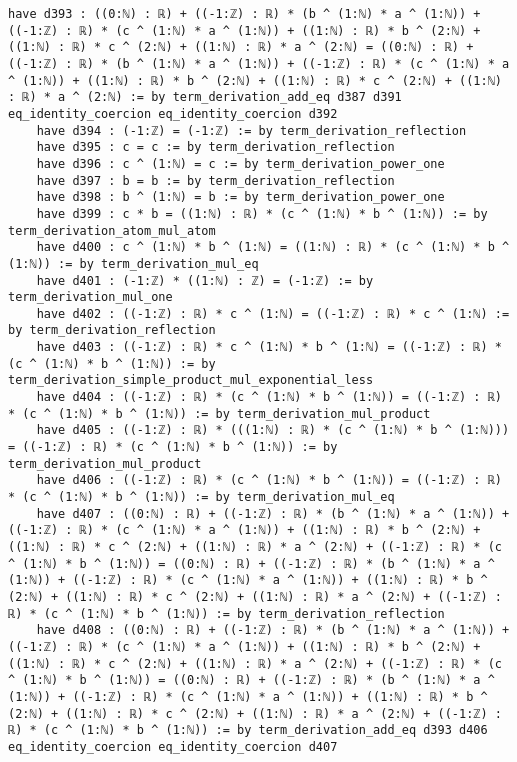 \documentclass{article}
\begin{document}
\begin{tcolorbox}[colback=white!10, width=\linewidth]
\begin{lstlisting}[language=Lean4]
    have d393 : ((0:ℕ) : ℝ) + ((-1:ℤ) : ℝ) * (b ^ (1:ℕ) * a ^ (1:ℕ)) + ((-1:ℤ) : ℝ) * (c ^ (1:ℕ) * a ^ (1:ℕ)) + ((1:ℕ) : ℝ) * b ^ (2:ℕ) + ((1:ℕ) : ℝ) * c ^ (2:ℕ) + ((1:ℕ) : ℝ) * a ^ (2:ℕ) = ((0:ℕ) : ℝ) + ((-1:ℤ) : ℝ) * (b ^ (1:ℕ) * a ^ (1:ℕ)) + ((-1:ℤ) : ℝ) * (c ^ (1:ℕ) * a ^ (1:ℕ)) + ((1:ℕ) : ℝ) * b ^ (2:ℕ) + ((1:ℕ) : ℝ) * c ^ (2:ℕ) + ((1:ℕ) : ℝ) * a ^ (2:ℕ) := by term_derivation_add_eq d387 d391 eq_identity_coercion eq_identity_coercion d392
    have d394 : (-1:ℤ) = (-1:ℤ) := by term_derivation_reflection
    have d395 : c = c := by term_derivation_reflection
    have d396 : c ^ (1:ℕ) = c := by term_derivation_power_one
    have d397 : b = b := by term_derivation_reflection
    have d398 : b ^ (1:ℕ) = b := by term_derivation_power_one
    have d399 : c * b = ((1:ℕ) : ℝ) * (c ^ (1:ℕ) * b ^ (1:ℕ)) := by term_derivation_atom_mul_atom
    have d400 : c ^ (1:ℕ) * b ^ (1:ℕ) = ((1:ℕ) : ℝ) * (c ^ (1:ℕ) * b ^ (1:ℕ)) := by term_derivation_mul_eq
    have d401 : (-1:ℤ) * ((1:ℕ) : ℤ) = (-1:ℤ) := by term_derivation_mul_one
    have d402 : ((-1:ℤ) : ℝ) * c ^ (1:ℕ) = ((-1:ℤ) : ℝ) * c ^ (1:ℕ) := by term_derivation_reflection
    have d403 : ((-1:ℤ) : ℝ) * c ^ (1:ℕ) * b ^ (1:ℕ) = ((-1:ℤ) : ℝ) * (c ^ (1:ℕ) * b ^ (1:ℕ)) := by term_derivation_simple_product_mul_exponential_less
    have d404 : ((-1:ℤ) : ℝ) * (c ^ (1:ℕ) * b ^ (1:ℕ)) = ((-1:ℤ) : ℝ) * (c ^ (1:ℕ) * b ^ (1:ℕ)) := by term_derivation_mul_product
    have d405 : ((-1:ℤ) : ℝ) * (((1:ℕ) : ℝ) * (c ^ (1:ℕ) * b ^ (1:ℕ))) = ((-1:ℤ) : ℝ) * (c ^ (1:ℕ) * b ^ (1:ℕ)) := by term_derivation_mul_product
    have d406 : ((-1:ℤ) : ℝ) * (c ^ (1:ℕ) * b ^ (1:ℕ)) = ((-1:ℤ) : ℝ) * (c ^ (1:ℕ) * b ^ (1:ℕ)) := by term_derivation_mul_eq
    have d407 : ((0:ℕ) : ℝ) + ((-1:ℤ) : ℝ) * (b ^ (1:ℕ) * a ^ (1:ℕ)) + ((-1:ℤ) : ℝ) * (c ^ (1:ℕ) * a ^ (1:ℕ)) + ((1:ℕ) : ℝ) * b ^ (2:ℕ) + ((1:ℕ) : ℝ) * c ^ (2:ℕ) + ((1:ℕ) : ℝ) * a ^ (2:ℕ) + ((-1:ℤ) : ℝ) * (c ^ (1:ℕ) * b ^ (1:ℕ)) = ((0:ℕ) : ℝ) + ((-1:ℤ) : ℝ) * (b ^ (1:ℕ) * a ^ (1:ℕ)) + ((-1:ℤ) : ℝ) * (c ^ (1:ℕ) * a ^ (1:ℕ)) + ((1:ℕ) : ℝ) * b ^ (2:ℕ) + ((1:ℕ) : ℝ) * c ^ (2:ℕ) + ((1:ℕ) : ℝ) * a ^ (2:ℕ) + ((-1:ℤ) : ℝ) * (c ^ (1:ℕ) * b ^ (1:ℕ)) := by term_derivation_reflection
    have d408 : ((0:ℕ) : ℝ) + ((-1:ℤ) : ℝ) * (b ^ (1:ℕ) * a ^ (1:ℕ)) + ((-1:ℤ) : ℝ) * (c ^ (1:ℕ) * a ^ (1:ℕ)) + ((1:ℕ) : ℝ) * b ^ (2:ℕ) + ((1:ℕ) : ℝ) * c ^ (2:ℕ) + ((1:ℕ) : ℝ) * a ^ (2:ℕ) + ((-1:ℤ) : ℝ) * (c ^ (1:ℕ) * b ^ (1:ℕ)) = ((0:ℕ) : ℝ) + ((-1:ℤ) : ℝ) * (b ^ (1:ℕ) * a ^ (1:ℕ)) + ((-1:ℤ) : ℝ) * (c ^ (1:ℕ) * a ^ (1:ℕ)) + ((1:ℕ) : ℝ) * b ^ (2:ℕ) + ((1:ℕ) : ℝ) * c ^ (2:ℕ) + ((1:ℕ) : ℝ) * a ^ (2:ℕ) + ((-1:ℤ) : ℝ) * (c ^ (1:ℕ) * b ^ (1:ℕ)) := by term_derivation_add_eq d393 d406 eq_identity_coercion eq_identity_coercion d407

\end{lstlisting}
\end{tcolorbox}
\end{document}
